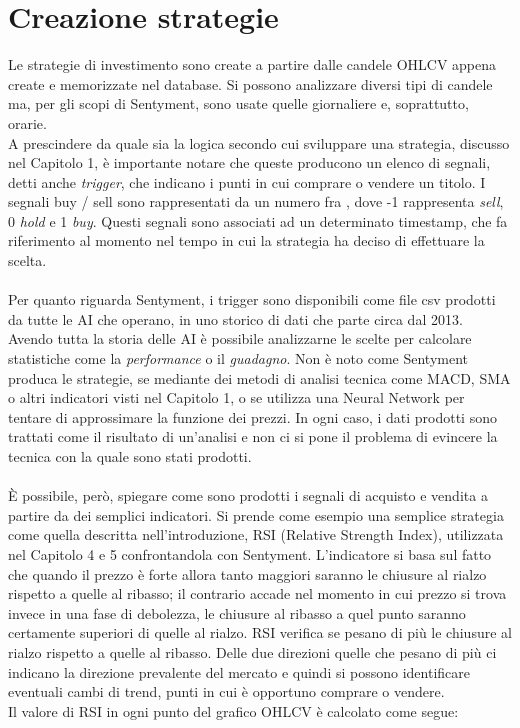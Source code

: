 \documentclass[a4paper,12pt]{report}
\begin{document}
\section{Creazione strategie}
Le strategie di investimento sono create a partire dalle candele OHLCV appena create e memorizzate nel database. Si possono analizzare diversi tipi di candele ma, per gli scopi di Sentyment, sono usate quelle giornaliere e, soprattutto, orarie.\\ A prescindere da quale sia la logica secondo cui sviluppare una strategia, discusso nel Capitolo 1, è importante notare che queste producono un elenco di segnali, detti anche \textit{trigger}, che indicano i punti in cui comprare o vendere un titolo. I segnali buy / sell sono rappresentati da un numero fra \big[ -1, 0, 1 \big], dove -1 rappresenta \textit{sell}, 0 \textit{hold} e 1 \textit{buy}. Questi segnali sono associati ad un determinato timestamp, che fa riferimento al momento nel tempo in cui la strategia ha deciso di effettuare la scelta.\\~\\ Per quanto riguarda Sentyment, i trigger sono disponibili come file csv prodotti da tutte le AI che operano, in uno storico di dati che parte circa dal 2013. Avendo tutta la storia delle AI è possibile analizzarne le scelte per calcolare statistiche come la \textit{performance} o il \textit{guadagno}. Non è noto come Sentyment produca le strategie, se mediante dei metodi di analisi tecnica come MACD, SMA o altri indicatori visti nel Capitolo 1, o se utilizza una Neural Network per tentare di approssimare la funzione dei prezzi. In ogni caso, i dati prodotti sono trattati come il risultato di un'analisi e non ci si pone il problema di evincere la tecnica con la quale sono stati prodotti. \\~\\ È possibile, però, spiegare come sono prodotti i segnali di acquisto e vendita a partire da dei semplici indicatori. Si prende come esempio una semplice strategia come quella descritta nell'introduzione, RSI (Relative Strength Index), utilizzata nel Capitolo 4 e 5 confrontandola con Sentyment. L'indicatore si basa sul fatto che quando il prezzo è forte allora tanto maggiori saranno le chiusure al rialzo rispetto a quelle al ribasso; il contrario accade nel momento in cui prezzo si trova invece in una fase di debolezza, le chiusure al ribasso a quel punto saranno certamente superiori di quelle al rialzo. RSI verifica se pesano di più le chiusure al rialzo rispetto a quelle al ribasso. Delle due direzioni quelle che pesano di più ci indicano la direzione prevalente del mercato e quindi si possono identificare eventuali cambi di trend, punti in cui è opportuno comprare o vendere.\\ Il valore di RSI in ogni punto del grafico OHLCV è calcolato come segue: 
\end{document}
